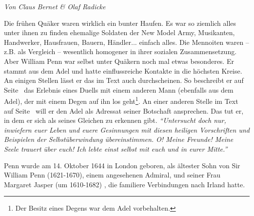 %
%
%


\begin{flushright}
\begin{footnotesize}
\textit{Von Claus Bernet \& Olaf Radicke}
\end{footnotesize}
\end{flushright}
\smallskip

Die frühen Quäker waren wirklich ein bunter Haufen. Es war so ziemlich alles
unter ihnen zu finden ehemalige Soldaten der New Model Army, Musikanten, Handwerker, Hausfrauen, Bauern, Händler... einfach alles.
Die Mennoiten  waren --
z.B. als Vergleich -- wesentlich homogener in ihrer sozialen Zusammensetzung.
Aber
William Penn war selbst unter Quäkern noch mal etwas besonderes. Er stammt aus
dem Adel und hatte einflussreiche Kontakte in die höchsten Kreise. An einigen
Stellen lässt er das im Text auch durchscheinen. So beschreibt er auf
Seite~\pageref{kap9_ab2_duell_penn} das Erlebnis eines Duells
mit einem anderen Mann (ebenfalls aus dem Adel), der mit einem Degen auf ihn los
geht\footnote{Der Besitz eines
Degens war dem Adel vorbehalten.}. An einer anderen Stelle im Text auf
Seite~\pageref{15_04_penn_alte_freunde} will er den Adel als Adressat seiner
Botschaft ansprechen. Das tut er, in dem er sich als seines Gleichen zu erkennen
gibt.
\textit{"`Untersucht doch nur, inwiefern euer Leben und euere Gesinnungen mit
diesen heiligen Vorschriften und Beispielen der Selbstüberwindung
übereinstimmen. O! Meine Freunde! Meine Seele trauert über euch! Ich lebte einst
selbst mit euch und in eurer Mitte."'}

\medskip

Penn wurde am 14. Oktober 1644 in London
 geboren, als ältester Sohn von Sir William Penn
(1621-1670), einem angesehenen Admiral, und
seiner Frau Margaret Jasper (um 1610-1682) ,
die familiere Verbindungen nach Irland  hatte.
\medskip

